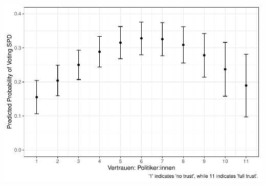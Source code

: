 \documentclass[
]{article}
\begin{document}
\includegraphics{AVCD_Final_Assignment-Edenhofer_files/figure-latex/spd-trust-politicians-1.pdf}
\end{document}
